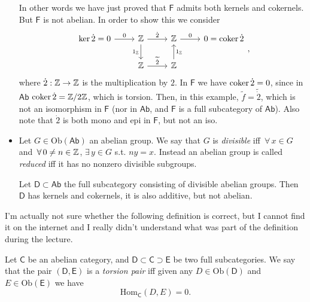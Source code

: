 \begin{ex}
\begin{itemize}
			In other words we have just proved that $\mathsf{F}$ admits both kernels and cokernels.
			But $\mathsf{F}$ is not abelian.
			In order to show this we consider
			\begin{equation}
			\begin{tikzcd}
				\ker \dot{2} = 0 \arrow[r, "0", rightarrow] & \Z \arrow[r, "\dot{2}", rightarrow] \arrow[d, "1_\Z"', rightarrow] &
				\Z \arrow[r, "0", rightarrow] & 0 = \coker \dot{2}\\
				 & \Z \arrow[r, "\widetilde{\dot{2}}", rightarrow] & \Z \arrow[u, "1_\Z"', rightarrow] & 
			\end{tikzcd}
			,\end{equation} 
			where $\dot{2}: \mathbb{Z} \to \mathbb{Z}$ is the multiplication by $2$.
			In $\mathsf{F}$ we have $\operatorname{coker} \dot{2} = 0$, since in $\mathsf{Ab}$ $\operatorname{coker} \dot{2} = \mathbb{Z}/2\mathbb{Z}$, which is torsion.
			Then, in this example, $\widetilde{f} = \widetilde{\dot{2}}$, which is not an isomorphism in $\mathsf{F}$ 
			(nor in $\mathsf{Ab}$, and $\mathsf{F}$ is a full subcategory of $\mathsf{Ab}$).
			Also note that $\dot{2}$ is both mono and epi in $\mathsf{F}$, but not an iso.


		\item Let $G \in \mathrm{Ob} \left(\mathsf{Ab}\right)$ an abelian group. 
			We say that $G$ is {\em divisible} iff $\,\forall\, x \in G$ and $\,\forall\,  0 \neq n \in \mathbb{Z}$, $\exists\, y \in G$ s.t. $ny = x$.
			Instead an abelian group is called {\em reduced} iff it has no nonzero divisible subgroups.

			Let $\mathsf{D} \subset \mathsf{Ab}$ the full subcategory consisting of divisible abelian groups.
			Then $\mathsf{D}$ has kernels and cokernels, it is also additive, but not abelian.
	\end{itemize}
\end{ex} 

I'm actually not sure whether the following definition is correct, but I cannot find it on the internet and I really didn't understand what was part of the definition during the lecture.
\begin{defn}
	Let $\mathsf{C}$ be an abelian category, and $\mathsf{D} \subset \mathsf{C} \supset \mathsf{E}$ be two full subcategories.
	We say that the pair $\left(\mathsf{D}, \mathsf{E}\right)$ is a {\em torsion pair} iff given any $D \in \mathrm{Ob} \left(\mathsf{D}\right)$ and $E \in \mathrm{Ob} \left(\mathsf{E}\right)$ we have
	\begin{equation}
	\mathrm{Hom}_{\mathsf{C}} \left( D, E \right) = 0
	.\end{equation} 
\end{defn}

